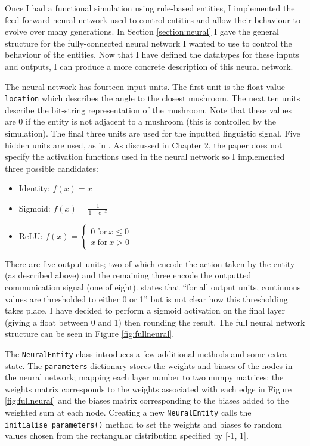 \documentclass[12pt,a4paper,twoside,openright]{report}
\begin{document}
Once I had a functional simulation using rule-based entities, I implemented the feed-forward neural network used to control entities and allow their behaviour to evolve over many generations. In Section \ref{section:neural} I gave the general structure for the fully-connected neural network I wanted to use to control the behaviour of the entities. Now that I have defined the datatypes for these inputs and outputs, I can produce a more concrete description of this neural network. 

The neural network has fourteen input units. The first unit is the float value \texttt{location} which describes the angle to the closest mushroom. The next ten units describe the bit-string representation of the mushroom. Note that these values are 0 if the entity is not adjacent to a mushroom (this is controlled by the simulation). The final three units are used for the inputted linguistic signal. Five hidden units are used, as in \citet{Cangelosi1998}. As discussed in Chapter 2, the paper does not specify the activation functions used in the neural network so I implemented three possible candidates:

\begin{itemize}
	\item Identity: $f(x) = x$
	\item Sigmoid: $f(x) = \frac{1}{1+e^{-x}}$
	\item ReLU: $ f(x) = 
    \left\{
        \begin{array}{ll}
          0~\mathrm{for}~x \leq 0 \\
          x~\mathrm{for}~x > 0
        \end{array}
      \right.
      $
\end{itemize}

There are five output units; two of which encode the action taken by the entity (as described above) and the remaining three encode the outputted communication signal (one of eight). \citet{Cangelosi1998} states that ``for all output units, continuous values are thresholded to either 0 or 1'' but is not clear how this thresholding takes place. I have decided to perform a sigmoid activation on the final layer (giving a float between 0 and 1) then rounding the result. The full neural network structure can be seen in Figure \ref{fig:fullneural}.

The \texttt{NeuralEntity} class introduces a few additional methods and some extra state. The \texttt{parameters} dictionary stores the weights and biases of the nodes in the neural network; mapping each layer number to two numpy matrices; the weights matrix corresponds to the weights associated with each edge in Figure \ref{fig:fullneural} and the biases matrix corresponding to the biases added to the weighted sum at each node. Creating a new \texttt{NeuralEntity} calls the \texttt{initialise\_parameters()} method to set the weights and biases to random values chosen from the rectangular distribution specified by [-1, 1].
\end{document}
